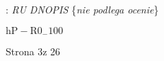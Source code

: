 \documentclass[a4paper,12pt]{article}
\begin{document}
: {\it RU DNOPIS} \{{\it nie podlega ocenie}\}

$\mathrm{h}\mathrm{P}-\mathrm{R}0_{-}100$

Strona 3z 26
\end{document}
